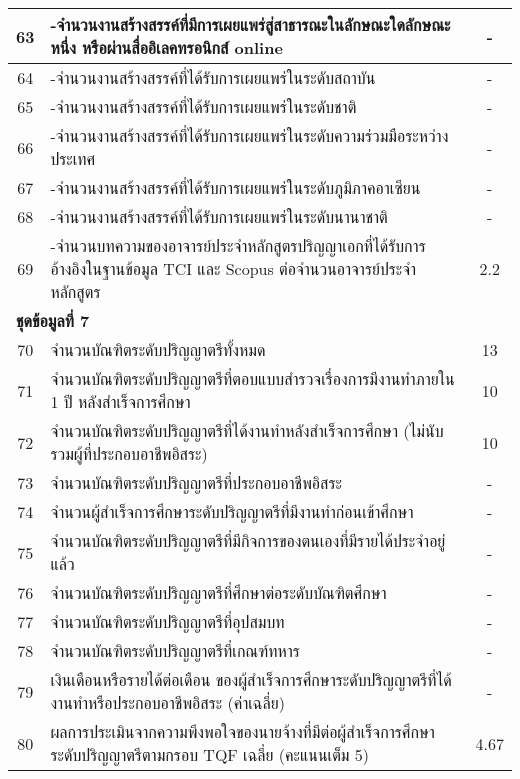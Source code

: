 \begin{longtable}{|c|p{}|c|}
	63&-จำนวนงานสร้างสรรค์ที่มีการเผยแพร่สู่สาธารณะในลักษณะใดลักษณะหนึ่ง หรือผ่านสื่ออิเลคทรอนิกส์ online&-\\\hline
	64&-จำนวนงานสร้างสรรค์ที่ได้รับการเผยแพร่ในระดับสถาบัน&-\\\hline
	65&-จำนวนงานสร้างสรรค์ที่ได้รับการเผยแพร่ในระดับชาติ&-\\\hline
	66&-จำนวนงานสร้างสรรค์ที่ได้รับการเผยแพร่ในระดับความร่วมมือระหว่างประเทศ&-\\\hline
	67&-จำนวนงานสร้างสรรค์ที่ได้รับการเผยแพร่ในระดับภูมิภาคอาเซียน&-\\\hline
	68&-จำนวนงานสร้างสรรค์ที่ได้รับการเผยแพร่ในระดับนานาชาติ &-\\\hline
	69&-จำนวนบทความของอาจารย์ประจำหลักสูตรปริญญาเอกที่ได้รับการอ้างอิงในฐานข้อมูล TCI และ Scopus ต่อจำนวนอาจารย์ประจำหลักสูตร &2.2\\\hline
	
	\multicolumn{3}{|l|}{\textbf{ชุดข้อมูลที่ 7}}\\\hline
	70&จำนวนบัณฑิตระดับปริญญาตรีทั้งหมด& 13\\\hline
	71&จำนวนบัณฑิตระดับปริญญาตรีที่ตอบแบบสำรวจเรื่องการมีงานทำภายใน 1 ปี หลังสำเร็จการศึกษา& 10\\\hline
	72&จำนวนบัณฑิตระดับปริญญาตรีที่ได้งานทำหลังสำเร็จการศึกษา (ไม่นับรวมผู้ที่ประกอบอาชีพอิสระ)& 10\\\hline
	73&จำนวนบัณฑิตระดับปริญญาตรีที่ประกอบอาชีพอิสระ &-\\\hline
	74&จำนวนผู้สำเร็จการศึกษาระดับปริญญาตรีที่มีงานทำก่อนเข้าศึกษา &-\\\hline
	75&จำนวนบัณฑิตระดับปริญญาตรีที่มีกิจการของตนเองที่มีรายได้ประจำอยู่แล้ว&-\\\hline
	76&จำนวนบัณฑิตระดับปริญญาตรีที่ศึกษาต่อระดับบัณฑิตศึกษา&-\\\hline
	77&จำนวนบัณฑิตระดับปริญญาตรีที่อุปสมบท&-\\\hline
	78&จำนวนบัณฑิตระดับปริญญาตรีที่เกณฑ์ทหาร&-\\\hline
	79&เงินเดือนหรือรายได้ต่อเดือน ของผู้สำเร็จการศึกษาระดับปริญญาตรีที่ได้งานทำหรือประกอบอาชีพอิสระ (ค่าเฉลี่ย)&-\\\hline
	80&ผลการประเมินจากความพึงพอใจของนายจ้างที่มีต่อผู้สำเร็จการศึกษาระดับปริญญาตรีตามกรอบ TQF เฉลี่ย (คะแนนเต็ม 5)& 4.67 \\\hline
	

\end{longtable}
